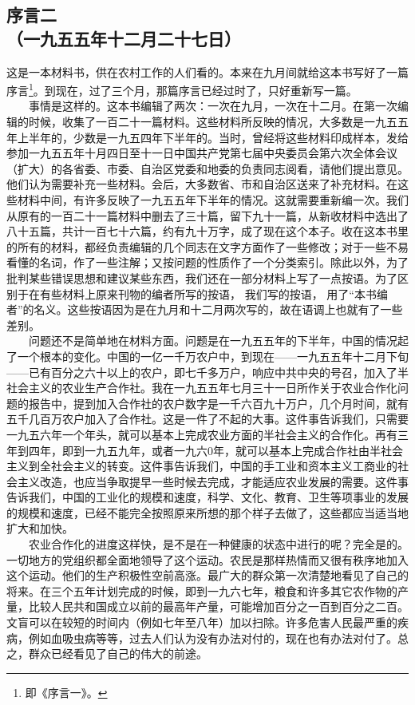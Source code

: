 \documentclass[cn,11pt,chinese]{elegantbook}
\def\myformat#1{\hfil\hfil #1}
\begin{document}
\subsection*{\myformat{序言二} \\ \myformat{（一九五五年十二月二十七日）}}
这是一本材料书，供在农村工作的人们看的。本来在九月间就给这本书写好了一篇序言\footnote[2]{ 即《序言一》。}。到现在，过了三个月，那篇序言已经过时了，只好重新写一篇。\\
　　事情是这样的。这本书编辑了两次：一次在九月，一次在十二月。在第一次编辑的时候，收集了一百二十一篇材料。这些材料所反映的情况，大多数是一九五五年上半年的，少数是一九五四年下半年的。当时，曾经将这些材料印成样本，发给参加一九五五年十月四日至十一日中国共产党第七届中央委员会第六次全体会议（扩大）的各省委、市委、自治区党委和地委的负责同志阅看，请他们提出意见。他们认为需要补充一些材料。会后，大多数省、市和自治区送来了补充材料。在这些材料中间，有许多反映了一九五五年下半年的情况。这就需要重新编一次。我们从原有的一百二十一篇材料中删去了三十篇，留下九十一篇，从新收材料中选出了八十五篇，共计一百七十六篇，约有九十万字，成了现在这个本子。收在这本书里的所有的材料，都经负责编辑的几个同志在文字方面作了一些修改；对于一些不易看懂的名词，作了一些注解；又按问题的性质作了一个分类索引。除此以外，为了批判某些错误思想和建议某些东西，我们还在一部分材料上写了一点按语。为了区别于在有些材料上原来刊物的编者所写的按语， 我们写的按语， 用了“本书编者”的名义。这些按语因为是在九月和十二月两次写的，故在语调上也就有了一些差别。\\
　　问题还不是简单地在材料方面。问题是在一九五五年的下半年，中国的情况起了一个根本的变化。中国的一亿一千万农户中，到现在——一九五五年十二月下旬——已有百分之六十以上的农户，即七千多万户，响应中共中央的号召，加入了半社会主义的农业生产合作社。我在一九五五年七月三十一日所作关于农业合作化问题的报告中，提到加入合作社的农户数字是一千六百九十万户，几个月时间，就有五千几百万农户加入了合作社。这是一件了不起的大事。这件事告诉我们，只需要一九五六年一个年头，就可以基本上完成农业方面的半社会主义的合作化。再有三年到四年，即到一九五九年，或者一九六0年，就可以基本上完成合作社由半社会主义到全社会主义的转变。这件事告诉我们，中国的手工业和资本主义工商业的社会主义改造，也应当争取提早一些时候去完成，才能适应农业发展的需要。这件事告诉我们，中国的工业化的规模和速度，科学、文化、教育、卫生等项事业的发展的规模和速度，已经不能完全按照原来所想的那个样子去做了，这些都应当适当地扩大和加快。\\
　　农业合作化的进度这样快，是不是在一种健康的状态中进行的呢？完全是的。一切地方的党组织都全面地领导了这个运动。农民是那样热情而又很有秩序地加入这个运动。他们的生产积极性空前高涨。最广大的群众第一次清楚地看见了自己的将来。在三个五年计划完成的时候，即到一九六七年，粮食和许多其它农作物的产量，比较人民共和国成立以前的最高年产量，可能增加百分之一百到百分之二百。文盲可以在较短的时间内（例如七年至八年）加以扫除。许多危害人民最严重的疾病，例如血吸虫病等等，过去人们认为没有办法对付的，现在也有办法对付了。总之，群众已经看见了自己的伟大的前途。\\
\end{document}
